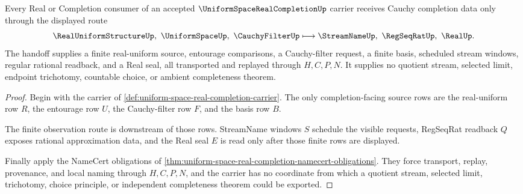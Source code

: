 \begin{theorem}
\label{thm:uniform-space-real-completion-cauchy-handoff}
Every Real or Completion consumer of an accepted $\UniformSpaceRealCompletionUp$ carrier receives Cauchy completion data only through the displayed route
$$
\RealUniformStructureUp,\ \UniformSpaceUp,\ \CauchyFilterUp
\longmapsto
\StreamNameUp,\ \RegSeqRatUp,\ \RealUp .
$$
The handoff supplies a finite real-uniform source, entourage comparisons, a Cauchy-filter request, a finite basis, scheduled stream windows, regular rational readback, and a Real seal, all transported and replayed through $H,C,P,N$. It supplies no quotient stream, selected limit, endpoint trichotomy, countable choice, or ambient completeness theorem.
\end{theorem}
\begin{proof}
Begin with the carrier of \autoref{def:uniform-space-real-completion-carrier}. The only completion-facing source rows are the real-uniform row $R$, the entourage row $U$, the Cauchy-filter row $F$, and the basis row $B$.

The finite observation route is downstream of those rows. StreamName windows $S$ schedule the visible requests, RegSeqRat readback $Q$ exposes rational approximation data, and the Real seal $E$ is read only after those finite rows are displayed.

Finally apply the NameCert obligations of \autoref{thm:uniform-space-real-completion-namecert-obligations}. They force transport, replay, provenance, and local naming through $H,C,P,N$, and the carrier has no coordinate from which a quotient stream, selected limit, trichotomy, choice principle, or independent completeness theorem could be exported.
\end{proof}


\begin{closurestatus}{\UniformSpaceRealCompletionUp}
  \theoryclosure{\seedClosure}
  \formalstatus{\unformalizedV}
\end{closurestatus}

